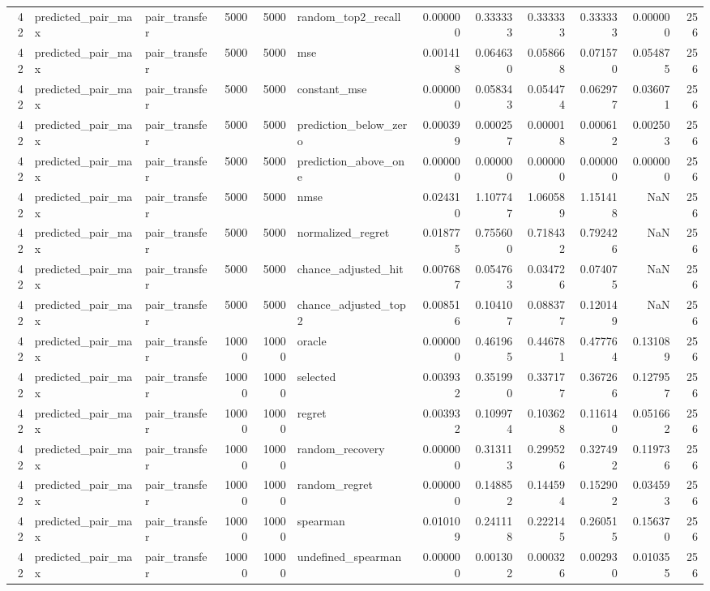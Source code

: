 \begin{tabular}{rllrrlrrrrrr}
42 & predicted_pair_max & pair_transfer & 5000 & 5000 & random_top2_recall & 0.000000 & 0.333333 & 0.333333 & 0.333333 & 0.000000 & 256 \\
42 & predicted_pair_max & pair_transfer & 5000 & 5000 & mse & 0.001418 & 0.064630 & 0.058668 & 0.071570 & 0.054875 & 256 \\
42 & predicted_pair_max & pair_transfer & 5000 & 5000 & constant_mse & 0.000000 & 0.058343 & 0.054474 & 0.062977 & 0.036071 & 256 \\
42 & predicted_pair_max & pair_transfer & 5000 & 5000 & prediction_below_zero & 0.000399 & 0.000257 & 0.000018 & 0.000612 & 0.002503 & 256 \\
42 & predicted_pair_max & pair_transfer & 5000 & 5000 & prediction_above_one & 0.000000 & 0.000000 & 0.000000 & 0.000000 & 0.000000 & 256 \\
42 & predicted_pair_max & pair_transfer & 5000 & 5000 & nmse & 0.024310 & 1.107747 & 1.060589 & 1.151418 & NaN & 256 \\
42 & predicted_pair_max & pair_transfer & 5000 & 5000 & normalized_regret & 0.018775 & 0.755600 & 0.718432 & 0.792426 & NaN & 256 \\
42 & predicted_pair_max & pair_transfer & 5000 & 5000 & chance_adjusted_hit & 0.007687 & 0.054763 & 0.034726 & 0.074075 & NaN & 256 \\
42 & predicted_pair_max & pair_transfer & 5000 & 5000 & chance_adjusted_top2 & 0.008516 & 0.104107 & 0.088377 & 0.120149 & NaN & 256 \\
42 & predicted_pair_max & pair_transfer & 10000 & 10000 & oracle & 0.000000 & 0.461965 & 0.446781 & 0.477764 & 0.131089 & 256 \\
42 & predicted_pair_max & pair_transfer & 10000 & 10000 & selected & 0.003932 & 0.351990 & 0.337177 & 0.367266 & 0.127957 & 256 \\
42 & predicted_pair_max & pair_transfer & 10000 & 10000 & regret & 0.003932 & 0.109974 & 0.103628 & 0.116140 & 0.051662 & 256 \\
42 & predicted_pair_max & pair_transfer & 10000 & 10000 & random_recovery & 0.000000 & 0.313113 & 0.299526 & 0.327492 & 0.119736 & 256 \\
42 & predicted_pair_max & pair_transfer & 10000 & 10000 & random_regret & 0.000000 & 0.148852 & 0.144594 & 0.152902 & 0.034593 & 256 \\
42 & predicted_pair_max & pair_transfer & 10000 & 10000 & spearman & 0.010109 & 0.241118 & 0.222145 & 0.260515 & 0.156370 & 256 \\
42 & predicted_pair_max & pair_transfer & 10000 & 10000 & undefined_spearman & 0.000000 & 0.001302 & 0.000326 & 0.002930 & 0.010355 & 256 \\

\end{tabular}
